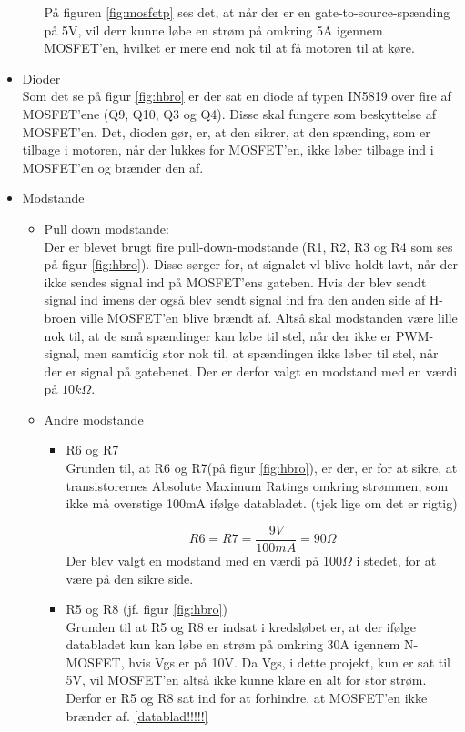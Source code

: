 \begin{itemize}
\begin{itemize}
	På figuren \ref{fig:mosfetp} ses det, at når der er en gate-to-source-spænding på 5V, vil derr kunne løbe en strøm på omkring 5A igennem MOSFET'en, hvilket er mere end nok til at få motoren til at køre. 
\end{itemize}

\item Dioder \\
Som det se på figur \ref{fig:hbro} er der sat en diode af typen IN5819 over fire af MOSFET'ene (Q9, Q10, Q3 og Q4). Disse skal fungere som beskyttelse af MOSFET'en. Det, dioden gør, er, at den sikrer, at den spænding, som er tilbage i motoren, når der lukkes for MOSFET'en, ikke løber tilbage ind i MOSFET'en og brænder den af.

\item Modstande
\begin{itemize}
	\item Pull down modstande:\\
	Der er blevet brugt fire pull-down-modstande (R1, R2, R3 og R4 som ses på figur \ref{fig:hbro}). Disse sørger for, at signalet vl blive holdt lavt, når der ikke sendes signal ind på MOSFET'ens gateben. Hvis der blev sendt signal ind imens der også blev sendt signal ind fra den anden side af H-broen ville MOSFET'en blive brændt af. Altså skal modstanden være lille nok til, at de små spændinger kan løbe til stel, når der ikke er PWM-signal, men samtidig stor nok til, at spændingen ikke løber til stel, når der er signal på gatebenet. Der er derfor valgt en modstand med en værdi på $10k\Omega$. 
	
	\item Andre modstande
	\begin{itemize}
		\item R6 og R7\\
			Grunden til, at R6 og R7(på figur \ref{fig:hbro}), er der, er for at sikre, at transistorernes Absolute Maximum Ratings omkring strømmen, som ikke må overstige 100mA ifølge databladet. (tjek lige om det er rigtig)
		
		\begin{displaymath}
			R6=R7=\frac {9V}{100mA} =90\Omega
		\end{displaymath}
		Der blev valgt en modstand med en værdi på 100$\Omega$ i stedet, for at være på den sikre side. 
		
		\item R5 og R8 (jf. figur \ref{fig:hbro})\\
		Grunden til at R5 og R8 er indsat i kredsløbet er, at der ifølge databladet kun kan løbe en strøm på omkring 30A igennem N-MOSFET, hvis Vgs er på 10V. Da Vgs, i  dette projekt, kun er sat til 5V, vil MOSFET'en altså ikke kunne klare en alt for stor strøm. Derfor er R5 og R8 sat ind for at forhindre, at MOSFET'en ikke brænder af. \ref{datablad!!!!!}
		

\end{itemize}
\end{itemize}
\end{itemize}
